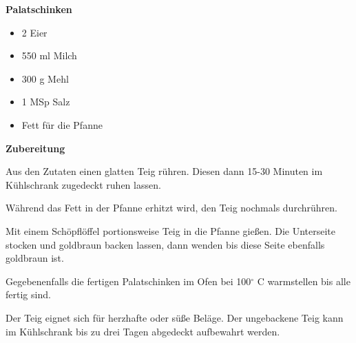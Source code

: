 

\parindent0pt	

\pagestyle{empty}


\textbf{{\LARGE Palatschinken}}%

\hrulefill
\vspace*{\fill}
\begin{multicols}{2}	


\begin{itemize}
\item 2 Eier
\item 550 ml Milch
\item 300 g Mehl
\item 1 MSp Salz
\item Fett für die Pfanne
\end{itemize}
\end{multicols}
\vfill									




\vfill
\newpage
\textbf{{\LARGE Zubereitung}}%

\hrulefill

\vspace*{\fill}
\begin{multicols}{2}

Aus den Zutaten einen glatten Teig rühren. Diesen dann 15-30 Minuten 
im Kühlschrank zugedeckt ruhen lassen.\newline

Während das Fett in der Pfanne erhitzt wird, den Teig nochmals durchrühren.\newline

Mit einem Schöpflöffel portionsweise Teig in die Pfanne gießen. Die Unterseite
stocken und goldbraun backen lassen, dann wenden bis diese Seite ebenfalls 
goldbraun ist.\newline

Gegebenenfalls die fertigen Palatschinken im Ofen bei 100$^\circ$ C warmstellen bis
alle fertig sind.

Der Teig eignet sich für herzhafte oder süße Beläge.
Der ungebackene Teig kann im Kühlschrank bis zu drei Tagen abgedeckt aufbewahrt werden.

\end{multicols}
\vfill
